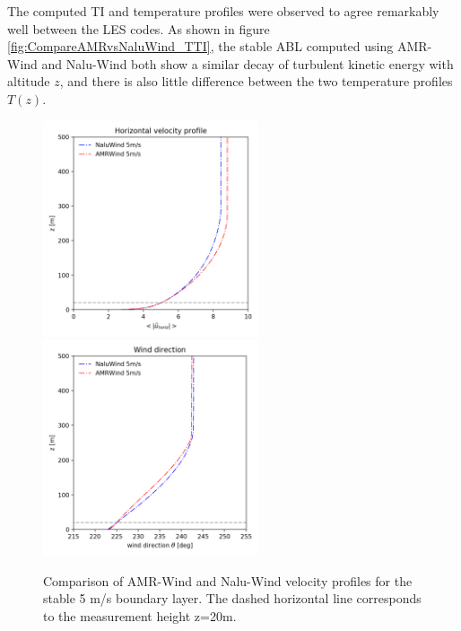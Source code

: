 The computed TI and temperature profiles were observed to agree
remarkably well between the LES codes. As shown in figure
\ref{fig:CompareAMRvsNaluWind_TTI}, the stable ABL computed using
AMR-Wind and Nalu-Wind both show a similar decay of turbulent kinetic
energy with altitude $z$, and there is also little difference between
the two temperature profiles $T(z)$.

\begin{figure} %
  \centering
  \includegraphics[width=2.5in]{figures/Compare_AMRWind_NaluWind/AMRWind_NaluWind_stable_05ms_mesh2p5_2p5_2p5_WS.png}
  \includegraphics[width=2.5in]{figures/Compare_AMRWind_NaluWind/AMRWind_NaluWind_stable_05ms_mesh2p5_2p5_2p5_Wdir.png}\\
  \caption{\label{fig:CompareAMRvsNaluWind_WSDir} Comparison of
    AMR-Wind and Nalu-Wind velocity profiles for the stable 5 m/s
    boundary layer. The dashed horizontal line corresponds to the
    measurement height z=20m. }
\end{figure}


